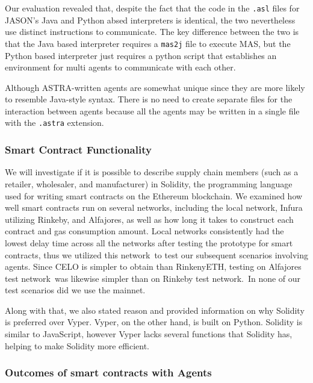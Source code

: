   \vspace{.5cm}
  
  Our evaluation revealed that, despite the fact that the code in the \texttt{.asl} files for JASON's Java and Python absed interpreters is identical, the two nevertheless use distinct instructions to communicate. The key difference between the two is that the Java based interpreter requires a \texttt{mas2j} file to execute \ac{MAS}, but the Python based interpreter just requires a python script that establishes an environment for multi agents to communicate with each other.

  \vspace{.5cm}

  Although \ac{ASTRA}-written agents are somewhat unique since they are more likely to resemble Java-style syntax. There is no need to create separate files for the interaction between agents because all the agents may be written in a single file with the \texttt{.astra} extension.
  
\subsubsection{Smart Contract Functionality}
  
  We will investigate if it is possible to describe supply chain members (such as a retailer, wholesaler, and manufacturer) in Solidity, the programming language used for writing smart contracts on the Ethereum blockchain. We examined how well smart contracts run on several networks, including the local network, Infura utilizing Rinkeby, and Alfajores, as well as how long it takes to construct each contract and gas consumption amount. Local networks consistently had the lowest delay time across all the networks after testing the prototype for smart contracts, thus we utilized this network to test our subsequent scenarios involving agents. Since CELO is simpler to obtain than RinkenyETH, testing on Alfajores test network was likewise simpler than on Rinkeby test network. In none of our test scenarios did we use the mainnet.
  
  \vspace{.5cm}
  
  Along with that, we also stated reason and provided information on why Solidity is preferred over Vyper. Vyper, on the other hand, is built on Python. Solidity is similar to JavaScript, however Vyper lacks several functions that Solidity has, helping to make Solidity more efficient.

\subsubsection{Outcomes of smart contracts with Agents}

